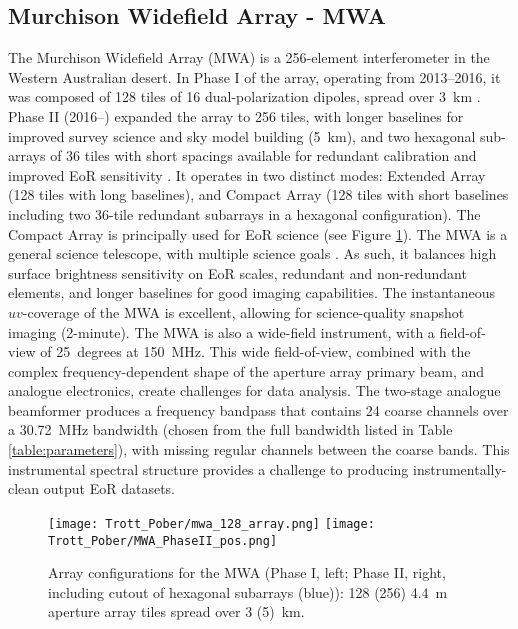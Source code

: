 \subsection{Murchison Widefield Array - MWA}
The Murchison Widefield Array (MWA) is a 256-element interferometer in the Western Australian desert. In Phase I of the array, operating from 2013--2016, it was composed of 128 tiles of 16 dual-polarization dipoles, spread over 3~km \cite{tingay13_mwasystem}. Phase II (2016--) expanded the array to 256 tiles, with longer baselines for improved survey science and sky model building (5~km), and two hexagonal sub-arrays of 36 tiles with short spacings available for redundant calibration and improved EoR sensitivity \cite{wayth18}. It operates in two distinct modes: Extended Array (128 tiles with long baselines), and Compact Array (128 tiles with short baselines including two 36-tile redundant subarrays in a hexagonal configuration). The Compact Array is principally used for EoR science (see Figure \ref{fig:mwa}).
The MWA is a general science telescope, with multiple science goals \cite{bowman13_mwascience}. As such, it balances high surface brightness sensitivity on EoR scales, redundant and non-redundant elements, and longer baselines for good imaging capabilities. The instantaneous $uv$-coverage of the MWA is excellent, allowing for science-quality snapshot imaging (2-minute). The MWA is also a wide-field instrument, with a field-of-view of 25~degrees at 150~MHz. This wide field-of-view, combined with the complex frequency-dependent shape of the aperture array primary beam, and analogue electronics, create challenges for data analysis. The two-stage analogue beamformer produces a frequency bandpass that contains 24 coarse channels over a 30.72~MHz bandwidth (chosen from the full bandwidth listed in Table \ref{table:parameters}), with missing regular channels between the coarse bands. This instrumental spectral structure provides a challenge to producing instrumentally-clean output EoR datasets.
\begin{figure}[ht]
\centering
\texttt{[image: Trott\_Pober/mwa\_128\_array.png]}
\texttt{[image: Trott\_Pober/MWA\_PhaseII\_pos.png]}
\caption{Array configurations for the MWA (Phase I, left; Phase II, right, including cutout of hexagonal subarrays (blue)): 128 (256) 4.4~m aperture array tiles spread over 3 (5)~km.}\label{fig:mwa}
\end{figure}

